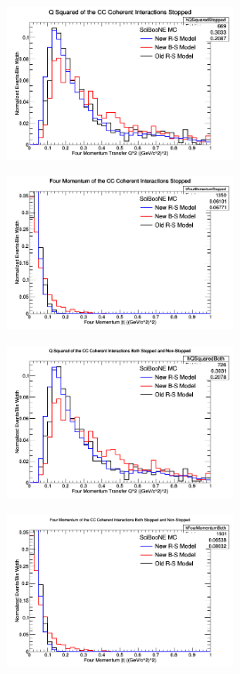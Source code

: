 \documentclass[11pt]{article}
\begin{document}
\begin{figure}[H]
\centering
\includegraphics[width=0.6\textwidth]{NMFourSquaredPlottingImages/3-NMFourSquaredPlotting.png}
\caption{}
\end{figure}

\begin{figure}[H]
\centering
\includegraphics[width=0.6\textwidth]{NMFourSquaredPlottingImages/4-NMFourSquaredPlotting.png}
\caption{}
\end{figure}

\begin{figure}[H]
\centering
\includegraphics[width=0.6\textwidth]{NMFourSquaredPlottingImages/5-NMFourSquaredPlotting.png}
\caption{}
\end{figure}

\begin{figure}[H]
\centering
\includegraphics[width=0.6\textwidth]{NMFourSquaredPlottingImages/6-NMFourSquaredPlotting.png}
\caption{}
\end{figure}
\end{document}
